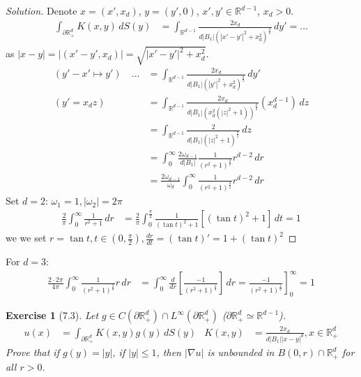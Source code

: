\documentclass{report}
\theoremstyle{tommy}
\newtheorem{ex}[defn]{Exercise}
\begin{document}
  \begin{proof}[Solution]
    Denote \(x = (x', x_d)\), \(y = (y', 0)\), \(x', y' \in \mathbb{R}^{d-1}\), \(x_d > 0\).
    \begin{align*}
      \int_{\partial \mathbb{R}_+^d} K(x,y) \, dS(y) &= \int_{\mathbb{R}^{d-1}} \frac{2 x_d}{d |B_1|\left(|x'-y'|^2 + x_d^2\right)^{\frac{d}{2}}} \, dy' = \dots
    \end{align*}
    as \(|x-y| = |(x'-y', x_d)| = \sqrt{|x'-y'|^2 + x_d^2}\).
    \begin{align*}
      (y'-x' \mapsto y') \quad \dots &= \int_{\mathbb{R}^{d-1}} \frac{2 x_d}{d |B_1|\left(|y'|^2 + x_d^2\right)^{\frac{d}{2}}} \, dy' \\
      (y' = x_d z) \quad &= \int_{\mathbb{R}^{d-1}} \frac{2 x_d}{d |B_1| \left(x_d^2 (|z|^2 + 1)\right)^{\frac{d}{2}}} \left(x_d^{d-1}\right) \, dz \\
      &= \int_{\mathbb{R}^{d-1}} \frac{2}{d|B_1|\left(|z|^2 + 1\right)^{\frac{d}{2}}} \, dz \\
      &= \int_0^\infty \frac{2 \omega_{d-1}}{d|B_1|} \frac{1}{(r^2+1)^{\frac{d}{2}}} r^{d-2} \, dr \\
      &= \frac{2 \omega_{d-1}}{\omega_d} \int_0^\infty \frac{1}{\left(r^2+1\right)^{\frac{d}{2}}} r^{d-2} \, dr
    \end{align*}
    Set \(d = 2\): \(\omega_1 = 1, |\omega_2| = 2 \pi\) 
    \begin{align*}
      \frac{2}{\pi} \int_0^\infty \frac{1}{r^2+1} \, dr 
      &= \frac{2}{\pi} \int_0^{\frac{\pi}{2}} \frac{1}{(\tan t)^2 +1} [(\tan t)^2 +1] \, dt = 1
    \end{align*}
    we we set \(r = \tan t, t \in \left(0, \frac{\pi}{2}\right), \frac{dr}{dt} = (\tan t)' = 1 + (\tan t)^2\)
  \end{proof}
  For \(d = 3\):
  \begin{align*}
    \frac{2 \cdot 2 \pi}{4 \pi} \int_0^\infty \frac{1}{(r^2 + 1)^{\frac{3}{2}}} r \, dr
    &= \int_0^\infty \frac{d}{dr} \left[\frac{-1}{(r^2+1)^{\frac{1}{2}}}\right] \, dr = \left. \frac{-1}{(r^2 + 1)^{\frac{1}{2}}}\right]_0^\infty = 1
  \end{align*}

  \begin{ex}[7.3]
    Let \(g \in C(\partial \mathbb{R}_+^d) \cap L^\infty(\partial \mathbb{R}_+^d)\) (\(\partial \mathbb{R}_+^d \simeq \mathbb{R}^{d-1}\)).
    \begin{align*}
      u(x) &= \int_{\partial \mathbb{R}_+^d} K(x,y) g(y) \, dS(y)
      &K(x,y) &= \frac{2 x_d}{d |B_1| |x-y|^d}, x \in \mathbb{R}_+^d
    \end{align*}
    Prove that if \(g(y) = |y|\), if \(|y| \le 1\), then \(|\nabla u|\) is unbounded in \(B(0,r) \cap \mathbb{R}_+^d\) for all \(r > 0\).
  \end{ex}
\end{document}

